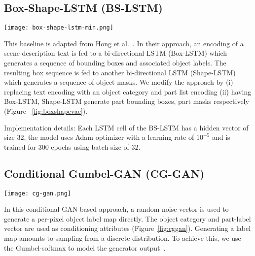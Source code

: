 \documentclass[runningheads]{llncs}
\begin{document}
\subsection{Box-Shape-LSTM (BS-LSTM)}

\begin{figure*}[!ht]
  \centering
  \texttt{[image: box-shape-lstm-min.png]}
  \caption{The architecture for Box-Shape-LSTM baseline. The curved black arrow represents sampling from a Gaussian Mixture Model. The Box LSTM is configured to output the parameters of the mixture model for each part. The mixture model itself is defined over the distribution of bounding boxes of parts. The sampled per-part bounding boxes are fed to Shape LSTM which generates corresponding part masks.}
  \label{fig:boxshapevae}
\end{figure*}

This baseline is adapted from Hong et al.~\cite{hong2018inferring}. In their approach, an encoding of a scene description text is fed to a bi-directional LSTM (Box-LSTM) which generates a sequence of bounding boxes and associated object labels. The resulting box sequence is fed to another bi-directional LSTM (Shape-LSTM) which generates a sequence of object masks. We modify the approach by (i) replacing text encoding with an object category and part list encoding (ii) having Box-LSTM, Shape-LSTM generate part bounding boxes, part masks respectively (Figure ~\ref{fig:boxshapevae}).

\noindent Implementation details: Each LSTM cell of the BS-LSTM has a hidden vector of size 32, the model uses  Adam optimizer with a learning rate of $10^{-5}$ and is trained for 300 epochs using batch size of $32$.

\subsection{Conditional Gumbel-GAN (CG-GAN)}

\begin{figure*}[!ht]
  \centering
  \texttt{[image: cg-gan.png]}
  \caption{The architecture for CG-GAN baseline. Conditioned on object category and list of parts, the Generator network stochastically generates a feasible object label map. The Discriminator network (towards bottom) attempts to distinguish between generated label maps and those from the training data.}
  \label{fig:cggan}
\end{figure*}

In this conditional GAN-based approach, a random noise vector is used to generate a per-pixel object label map directly. The object category and part-label vector are used as conditioning attributes (Figure~\ref{fig:cggan}). Generating a label map amounts to sampling from a discrete distribution. To achieve this, we use the Gumbel-softmax to model the generator output~\cite{kusner2016gans}.
\end{document}
